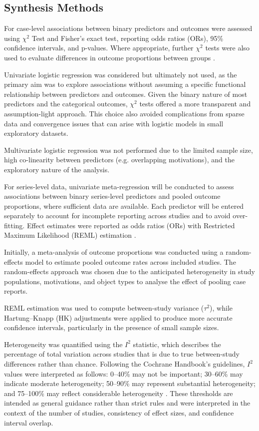 \subsection{Synthesis Methods}

\noindent For case-level associations between binary predictors and outcomes were assessed using $\chi^2$ Test and Fisher's exact test, reporting odds ratios (ORs), 95\% confidence intervals, and p-values. Where appropriate, further $\chi^2$ tests were also used to evaluate differences in outcome proportions between groups \cite{Machin_2008}. 

Univariate logistic regression was considered but ultimately not used, as the primary aim was to explore associations without assuming a specific functional relationship between predictors and outcomes. Given the binary nature of most predictors and the categorical outcomes, $\chi^2$ tests offered a more transparent and assumption-light approach. This choice also avoided complications from sparse data and convergence issues that can arise with logistic models in small exploratory datasets.

Multivariate logistic regression was not performed due to the limited sample size, high co-linearity between predictors (e.g. overlapping motivations), and the exploratory nature of the analysis. 

For series-level data, univariate meta-regression will be conducted to assess associations between binary series-level predictors and pooled outcome proportions, where sufficient data are available. Each predictor will be entered separately to account for incomplete reporting across studies and to avoid over-fitting. Effect estimates were reported as odds ratios (ORs) with Restricted Maximum Likelihood (REML) estimation \cite{Tanriver-Ayder_2021}.

Initially, a meta-analysis of outcome proportions was conducted using a random-effects model to estimate pooled outcome rates across included studies. The random-effects approach was chosen due to the anticipated heterogeneity in study populations, motivations, and object types to analyse the effect of pooling case reports.

REML estimation was used to compute between-study variance ($\tau^2$), while Hartung–Knapp (HK) adjustments were applied to produce more accurate confidence intervals, particularly in the presence of small sample sizes.

Heterogeneity was quantified using the $I^2$ statistic, which describes the percentage of total variation across studies that is due to true between-study differences rather than chance. Following the Cochrane Handbook’s guidelines, $I^2$ values were interpreted as follows: 0--40\% may not be important; 30--60\% may indicate moderate heterogeneity; 50--90\% may represent substantial heterogeneity; and 75--100\% may reflect considerable heterogeneity \cite{Sterne_2017}. These thresholds are intended as general guidance rather than strict rules and were interpreted in the context of the number of studies, consistency of effect sizes, and confidence interval overlap.

